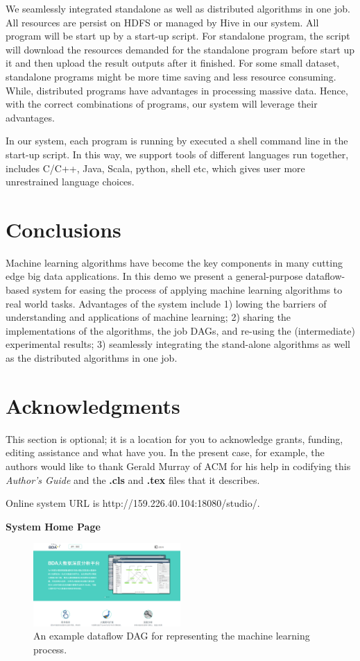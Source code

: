 \documentclass{sig-alternate-05-2015}
\begin{document}
We seamlessly integrated standalone as well as distributed algorithms in one job. All resources are persist on HDFS or managed by Hive in our system. All program will be start up by a start-up script. For standalone program, the script will download the resources demanded for the standalone program before start up it and then upload the result outputs after it finished. For some small dataset, standalone programs might be more time saving and less resource consuming. While, distributed programs have advantages in processing massive data. Hence, with the correct combinations of programs, our system will leverage their advantages.

In our system, each program is running by executed a shell command line in the start-up script. In this way, we support tools of different languages run together, includes C/C++, Java, Scala, python, shell etc, which gives user more unrestrained language choices.

\section{Conclusions}
Machine learning algorithms have become the key components in many cutting edge big data applications. In this demo we present a general-purpose dataflow-based system for easing the process of applying machine learning algorithms to real world tasks. Advantages of the system include 1) lowing the barriers of understanding and applications of machine learning; 2) sharing the implementations of the algorithms, the job DAGs, and re-using the (intermediate) experimental results; 3) seamlessly integrating the stand-alone algorithms as well as the distributed algorithms in one job.

\section{Acknowledgments}
This section is optional; it is a location for you
to acknowledge grants, funding, editing assistance and
what have you.  In the present case, for example, the
authors would like to thank Gerald Murray of ACM for
his help in codifying this \textit{Author's Guide}
and the \textbf{.cls} and \textbf{.tex} files that it describes.

\appendix

Online system URL is http://159.226.40.104:18080/studio/. 

\textbf{System Home Page}
\begin{figure}[!htb]
\centering
\includegraphics[width = 0.5\textwidth]{HomePage.eps}
\caption{An example dataflow DAG for representing the machine learning process.}
\label{fig:dag}
\end{figure}
\end{document}

